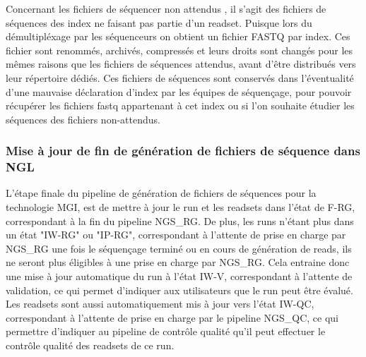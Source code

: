 Concernant les fichiers de séquencer \og non attendus \fg{}, il s'agit des fichiers de séquences des index ne faisant pas partie d'un readset. Puisque lors du démultipléxage par les séquenceurs on obtient un fichier FASTQ par index.
Ces fichier sont renommés, archivés, compressés et leurs droits sont changés pour les mêmes raisons que les fichiers de séquences \og attendus\fg{}, avant d'être distribués vers leur répertoire dédiés.
Ces fichiers de séquences sont conservés dans l'éventualité d'une mauvaise déclaration d'index par les équipes de séquençage, pour pouvoir récupérer les fichiers fastq appartenant à cet index ou si l'on souhaite étudier les séquences des fichiers \og non-attendus\fg{}.\\

\subsubsection*{Mise à jour de fin de génération de fichiers de séquence dans NGL}
L'étape finale du pipeline de génération de fichiers de séquences pour la technologie MGI, est de mettre à jour le run et les readsets dans l'état de \og F-RG\fg{}, correspondant à la fin du pipeline NGS\_RG.
De plus, les runs n'étant plus dans un état "IW-RG" ou "IP-RG", correspondant à l'attente de prise en charge par NGS\_RG une fois le séquençage terminé ou en cours de génération de reads, ils ne seront plus éligibles à une prise en charge par NGS\_RG.
Cela entraine donc une mise à jour automatique du run à l'état \og IW-V\fg{}, correspondant à l'attente de validation, ce qui permet d'indiquer aux utilisateurs que le run peut être évalué.
Les readsets sont aussi automatiquement mis à jour vers l'état \og IW-QC\fg{}, correspondant à l'attente de prise en charge par le pipeline NGS\_QC, ce qui permettre d'indiquer au pipeline de contrôle qualité qu'il peut effectuer le contrôle qualité des readsets de ce run.

